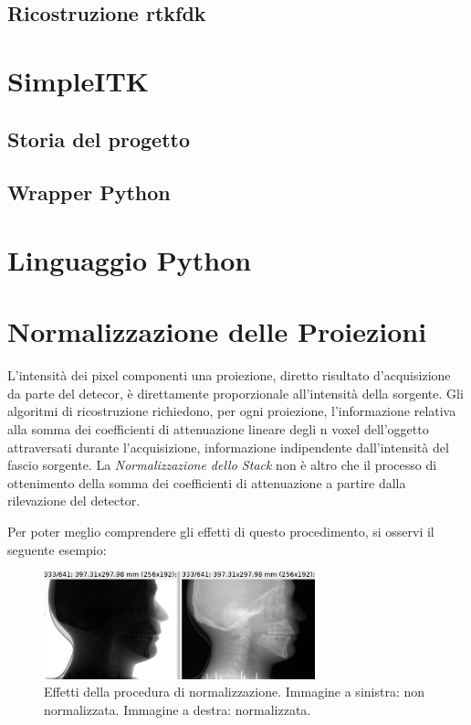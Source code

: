 \documentclass[a4paper,11pt, oneside]{article}
\begin{document}
            \subsection{Ricostruzione rtkfdk}

        \section{SimpleITK}
            \subsection{Storia del progetto}
            \subsection{Wrapper Python}
                
        \section{Linguaggio Python}
            
        \section{Normalizzazione delle Proiezioni}
            \par
                L'intensità dei pixel componenti una proiezione, diretto risultato d'acquisizione da parte del detecor, è direttamente proporzionale all'intensità della sorgente. Gli algoritmi di ricostruzione richiedono, per ogni proiezione, l'informazione relativa alla somma dei coefficienti di attenuazione lineare degli n voxel dell'oggetto attraversati durante l'acquisizione, informazione indipendente dall'intensità del fascio sorgente. La \textit{Normalizzazione dello Stack} non è altro che il processo di ottenimento della somma dei coefficienti di attenuazione a partire dalla rilevazione del detector.
            \par
                Per poter meglio comprendere gli effetti di questo procedimento, si osservi il seguente esempio:
                
                \begin{figure}[h]
                    \centering
                    \includegraphics[width=0.7\textwidth]{normalization}
                    \caption{Effetti della procedura di normalizzazione. Immagine a sinistra: non normalizzata. Immagine a destra: normalizzata.}
                    \label{fig:skull}
                \end{figure}
                
\end{document}
